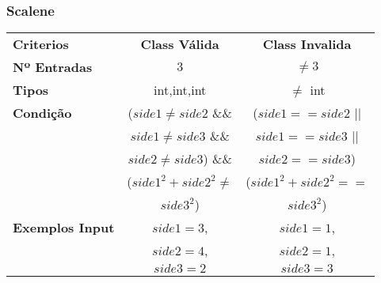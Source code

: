 \subsubsection{Scalene}
\begin{center}
  \begin{tabular}{lcc}
    \textbf{Criterios}  & \textbf{Class Válida} & \textbf{Class Invalida} \\
    \textbf{Nº Entradas} & $ 3 $ & $ \ne 3 $ \\
    \textbf{Tipos} & int,int,int & $\ne$ int  \\
    \textbf{Condição}
    & ($side1 \ne side2$ \&\&  & ($side1==side2$ || \\
    & $side1 \ne side3$ \&\&   & $side1==side3$ || \\
    & $side2 \ne side3$) \&\&  & $side2==side3$) \\
    & ($side1^2 + side2^2 \ne$ & ($side1^2 + side2^2 ==$ \\
    & $side3^2$)               & $side3^2$) \\
    \textbf{Exemplos Input}
    & $side1=3$, & $side1=1$, \\
    & $side2=4$, & $side2=1$, \\
    & $side3=2$  & $side3=3$
  \end{tabular}
\end{center}
